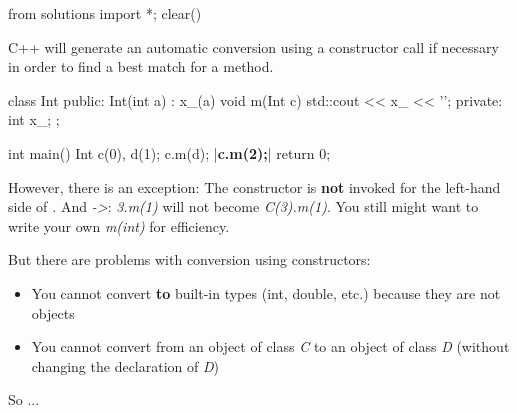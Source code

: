 \begin{python0}
from solutions import *; clear()
\end{python0}

C++ will generate an automatic conversion using a constructor call if
necessary in order to find a best match for a method.

\begin{consolethree}[escapeinside=||]
class Int
{
public:
    Int(int a)
        : x_(a)
    {}
    void m(Int c) { std::cout << x_ << '\n'; }
private:
    int x_;
};
\end{consolethree}

\begin{consolethree}[escapeinside=||]
int main()
{
    Int c(0), d(1);
    c.m(d);
    |{\bf c.m(2);}|
    return 0;
}
\end{consolethree}

However, there is an exception: The constructor is \textbf{not} invoked
for the left-hand side of \textit{.} And \textit{->}:
\textit{3.m(1)} will not become \textit{C(3).m(1)}. You still might want to
write your own \textit{m(int)} for efficiency.

But there are problems with conversion using constructors:

\begin{itemize}
\item You cannot convert \textbf{to} built-in types (int, double, etc.)
  because they are not objects
\item You cannot convert from an object of class \textit{C} to an object of
  class \textit{D} (without changing the declaration of \textit{D})
\end{itemize}

So ...


